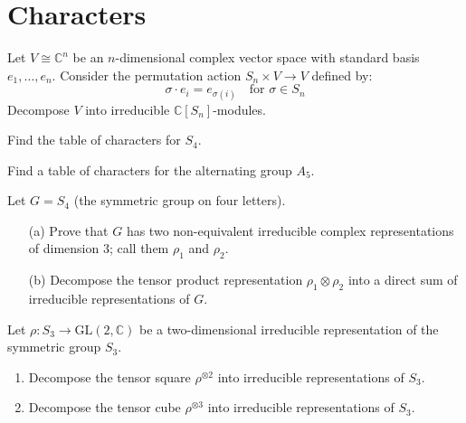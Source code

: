 \section{Characters}

\begin{prob}[S2008-Q4]
    Let \( V \cong \mathbb{C}^n \) be an \( n \)-dimensional complex vector space with standard basis \( e_1, \ldots, e_n \). Consider the permutation action \( S_n \times V \to V \) defined by:
    \[
    \sigma \cdot e_i = e_{\sigma(i)} \quad \text{for } \sigma \in S_n
    \]
    Decompose \( V \) into irreducible \( \mathbb{C}[S_n] \)-modules.
\end{prob}

\begin{prob}[S2014-Q5]
    Find the table of characters for $S_4$.
\end{prob}

\begin{prob}[F2016-Q6]
    Find a table of characters for the alternating group $A_5$.
\end{prob}


\begin{prob}[F2015-Q3]
    Let \( G = S_4 \) (the symmetric group on four letters).

\begin{enumerate}
    \item[(a)] Prove that \( G \) has two non-equivalent irreducible complex representations of dimension 3; call them \( \rho_1 \) and \( \rho_2 \).
    
    \item[(b)] Decompose the tensor product representation \( \rho_1 \otimes \rho_2 \) into a direct sum of irreducible representations of \( G \).
\end{enumerate}
\end{prob}


\begin{prob}[F2011-Q4]
    Let \(\rho \colon S_3 \to \mathrm{GL}(2, \mathbb{C})\) be a two-dimensional irreducible representation of the symmetric group \(S_3\). 

\begin{enumerate}
    \item Decompose the tensor square \(\rho^{\otimes 2}\) into irreducible representations of \(S_3\).
    \item Decompose the tensor cube \(\rho^{\otimes 3}\) into irreducible representations of \(S_3\).
\end{enumerate}
\end{prob}

